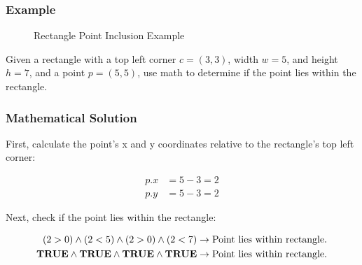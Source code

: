 \subsubsection{Example}

\begin{figure}[H]
    \begin{center}

        \caption{Rectangle Point Inclusion Example}
    \end{center}
\end{figure}

Given a rectangle with a top left corner $c = (3, 3)$, width $w = 5$, and
height $h = 7$, and a point $p = (5, 5)$, use math to determine if the point
lies within the rectangle.

\subsubsection{Mathematical Solution}
First, calculate the point's x and y coordinates relative to the rectangle's
top left corner:

\begin{equation*}
    \begin{aligned}
        p.x & = 5 - 3 = 2 \\
        p.y & = 5 - 3 = 2
    \end{aligned}
\end{equation*}

Next, check if the point lies within the rectangle:

\begin{equation*}
    \begin{aligned}
        (2 > 0) \land (2 < 5) \land (2 > 0) \land (2 < 7) \rightarrow \text{Point lies within rectangle}. \\
        \textnormal{\textbf{TRUE}} \land \textnormal{\textbf{TRUE}} \land \textnormal{\textbf{TRUE}} \land \textnormal{\textbf{TRUE}} \rightarrow \text{Point lies within rectangle}.
    \end{aligned}
\end{equation*}

